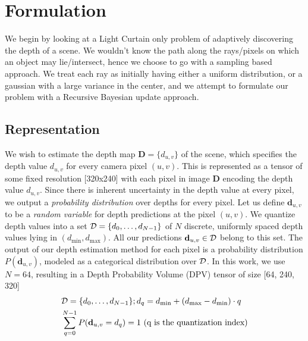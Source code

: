 
\section{Formulation}

\newcommand{\DD}{\mathbf{D}}
\newcommand{\dd}{\mathbf{d}}

We begin by looking at a Light Curtain only problem of adaptively discovering the depth of a scene. We wouldn't know the path along the rays/pixels on which an object may lie/intersect, hence we choose to go with a sampling based approach. We treat each ray as initially having either a uniform distribution, or a gaussian with a large variance in the center, and we attempt to formulate our problem with a Recursive Bayesian update approach.

\subsection{Representation}

\smallskip
We wish to estimate the depth map $\DD = \{d_{u, v}\}$ of the scene, which specifies the depth value $d_{u, v}$ for every camera pixel $(u, v)$. This is represented as a tensor of some fixed resolution [320x240] with each pixel in image $\DD$ encoding the depth value $d_{u,v}$. Since there is inherent uncertainty in the depth value at every pixel, we output a \textit{probability distribution} over depths for every pixel. Let us define $\dd_{u,v}$ to be a \textit{random variable} for depth predictions at the pixel $(u, v)$. We quantize depth values into a set $\mathcal{D} = \{d_0, \dots, d_{N-1}\}$ of $N$ discrete, uniformly spaced depth values lying in $(d_\text{min}, d_\text{max})$. All our predictions $\dd_{u, v} \in \D$ belong to this set. The output of our depth estimation method for each pixel is a probability distribution $P(\dd_{u, v})$, modeled as a categorical distribution over $\mathcal{D}$. In this work, we use $N=64$, resulting in a Depth Probability Volume (DPV) tensor of size [64, 240, 320]
\begin{align}
   &\D=\{d_0, \dots, d_{N-1}\}; d_{q}=d_\text{min}+(d_\text{max}-d_\text{min}) \cdot q
   \label{eq:d_candi}
   \\
   &\sum_{q=0}^{N-1} P(\dd_{u,v} = d_q) =1 \ \text{(q is the quantization index)}
   \label{eq:depth_dist}
\end{align}

